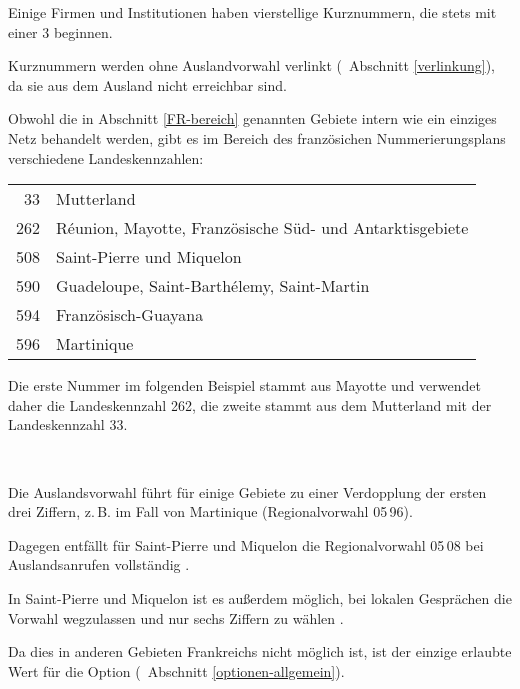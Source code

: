 \documentclass[numbers=noenddot]{scrreprt}
\newcommand*{\vglAbschnitt}[1]{(\cf\ Abschnitt \ref{#1})}
\begin{document}
Einige Firmen und Institutionen haben vierstellige Kurznummern, die stets mit einer 3 beginnen.
\begin{sidebyside}
\end{sidebyside}
Kurznummern werden ohne Auslandvorwahl verlinkt
\vglAbschnitt{verlinkung}, da sie aus dem Ausland nicht erreichbar sind.

Obwohl die in Abschnitt \ref{FR-bereich} genannten Gebiete intern wie ein einziges Netz behandelt werden, gibt es im Bereich des französichen Nummerierungsplans verschiedene Landeskennzahlen:
\begin{center}
\begin{tabular}{rl}
33 & Mutterland \\
262 & R\'eunion, Mayotte, Französische Süd- und Antarktisgebiete \\
508 & Saint-Pierre und Miquelon \\
590 & Guadeloupe, Saint-Barth\'elemy, Saint-Martin \\
594 & Französisch-Guayana \\
596 & Martinique \\
\end{tabular}
\end{center}
Die erste Nummer im folgenden Beispiel stammt aus Mayotte und verwendet daher die Landeskennzahl 262, die zweite stammt aus dem Mutterland mit der Landeskennzahl 33.
\begin{sidebyside}
   \\
\end{sidebyside}

Die Auslandsvorwahl führt für einige Gebiete zu einer Verdopplung der ersten drei Ziffern, z.\,B. im Fall von Martinique (Regionalvorwahl 05\,96).
\begin{sidebyside}
\end{sidebyside}
Dagegen entfällt für Saint-Pierre und Miquelon die Regionalvorwahl 05\,08 bei Auslandsanrufen vollständig \cite[4]{ARCEP}.
\begin{sidebyside}
\end{sidebyside}

In Saint-Pierre und Miquelon ist es außerdem möglich, bei lokalen Gesprächen die Vorwahl wegzulassen und nur sechs Ziffern zu wählen \cite[4]{ARCEP}.
\begin{sidebyside}
\end{sidebyside}
Da dies in anderen Gebieten Frankreichs nicht möglich ist, ist  der einzige erlaubte Wert für die Option  \vglAbschnitt{optionen-allgemein}.
\end{document}
